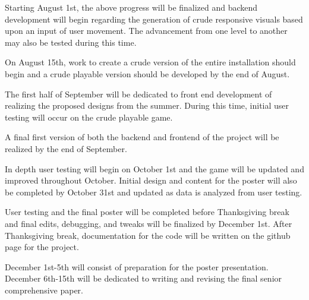 \documentclass[10pt,twocolumn]{article}
\begin{document}
Starting August 1st, the above progress will be finalized and backend development will begin regarding the generation of crude responsive visuals based upon an input of user movement.  The advancement from one level to another may also be tested during this time. 

On August 15th, work to create a crude version of the entire installation should begin and a crude playable version should be developed by the end of August. 

The first half of September will be dedicated to front end development of realizing the proposed designs from the summer. During this time, initial user testing will occur on the crude playable game. 

A final first version of both the backend and frontend of the project will be realized by the end of September. 

In depth user testing will begin on October 1st and the game will be updated and improved throughout October.  Initial design and content for the poster will also be completed by October 31st and updated as data is analyzed from user testing. 

User testing and the final poster will be completed before Thanksgiving break and final edits, debugging, and tweaks will be finalized by December 1st. After Thanksgiving break, documentation for the code will be written on the github page for the project. 

December 1st-5th will consist of preparation for the poster presentation.  December 6th-15th will be dedicated to writing and revising the final senior comprehensive paper. 

\printbibliography 
\end{document}

